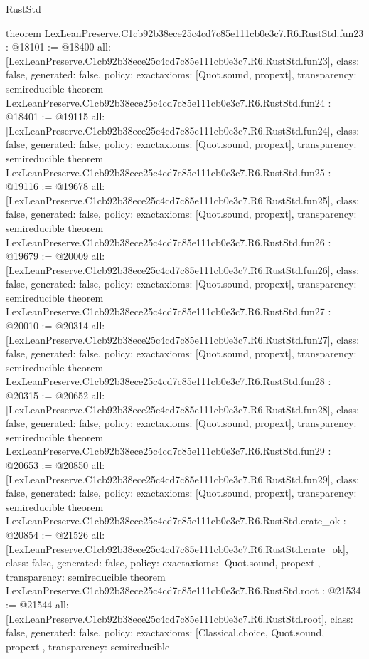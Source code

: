 \begin{lexlean}{RustStd}
\begin{coremodule}
{}
theorem LexLeanPreserve.C1cb92b38ece25c4cd7c85e111cb0e3c7.R6.RustStd.fun23 : @18101 := @18400 {
  all: [LexLeanPreserve.C1cb92b38ece25c4cd7c85e111cb0e3c7.R6.RustStd.fun23],
  class: false,
  generated: false,
  policy: exact{axioms: [Quot.sound, propext]},
  transparency: semireducible
}
theorem LexLeanPreserve.C1cb92b38ece25c4cd7c85e111cb0e3c7.R6.RustStd.fun24 : @18401 := @19115 {
  all: [LexLeanPreserve.C1cb92b38ece25c4cd7c85e111cb0e3c7.R6.RustStd.fun24],
  class: false,
  generated: false,
  policy: exact{axioms: [Quot.sound, propext]},
  transparency: semireducible
}
theorem LexLeanPreserve.C1cb92b38ece25c4cd7c85e111cb0e3c7.R6.RustStd.fun25 : @19116 := @19678 {
  all: [LexLeanPreserve.C1cb92b38ece25c4cd7c85e111cb0e3c7.R6.RustStd.fun25],
  class: false,
  generated: false,
  policy: exact{axioms: [Quot.sound, propext]},
  transparency: semireducible
}
theorem LexLeanPreserve.C1cb92b38ece25c4cd7c85e111cb0e3c7.R6.RustStd.fun26 : @19679 := @20009 {
  all: [LexLeanPreserve.C1cb92b38ece25c4cd7c85e111cb0e3c7.R6.RustStd.fun26],
  class: false,
  generated: false,
  policy: exact{axioms: [Quot.sound, propext]},
  transparency: semireducible
}
theorem LexLeanPreserve.C1cb92b38ece25c4cd7c85e111cb0e3c7.R6.RustStd.fun27 : @20010 := @20314 {
  all: [LexLeanPreserve.C1cb92b38ece25c4cd7c85e111cb0e3c7.R6.RustStd.fun27],
  class: false,
  generated: false,
  policy: exact{axioms: [Quot.sound, propext]},
  transparency: semireducible
}
theorem LexLeanPreserve.C1cb92b38ece25c4cd7c85e111cb0e3c7.R6.RustStd.fun28 : @20315 := @20652 {
  all: [LexLeanPreserve.C1cb92b38ece25c4cd7c85e111cb0e3c7.R6.RustStd.fun28],
  class: false,
  generated: false,
  policy: exact{axioms: [Quot.sound, propext]},
  transparency: semireducible
}
theorem LexLeanPreserve.C1cb92b38ece25c4cd7c85e111cb0e3c7.R6.RustStd.fun29 : @20653 := @20850 {
  all: [LexLeanPreserve.C1cb92b38ece25c4cd7c85e111cb0e3c7.R6.RustStd.fun29],
  class: false,
  generated: false,
  policy: exact{axioms: [Quot.sound, propext]},
  transparency: semireducible
}
theorem LexLeanPreserve.C1cb92b38ece25c4cd7c85e111cb0e3c7.R6.RustStd.crate_ok : @20854 := @21526 {
  all: [LexLeanPreserve.C1cb92b38ece25c4cd7c85e111cb0e3c7.R6.RustStd.crate_ok],
  class: false,
  generated: false,
  policy: exact{axioms: [Quot.sound, propext]},
  transparency: semireducible
}
theorem LexLeanPreserve.C1cb92b38ece25c4cd7c85e111cb0e3c7.R6.RustStd.root : @21534 := @21544 {
  all: [LexLeanPreserve.C1cb92b38ece25c4cd7c85e111cb0e3c7.R6.RustStd.root],
  class: false,
  generated: false,
  policy: exact{axioms: [Classical.choice, Quot.sound, propext]},
  transparency: semireducible
}


\end{coremodule}
\end{lexlean}
